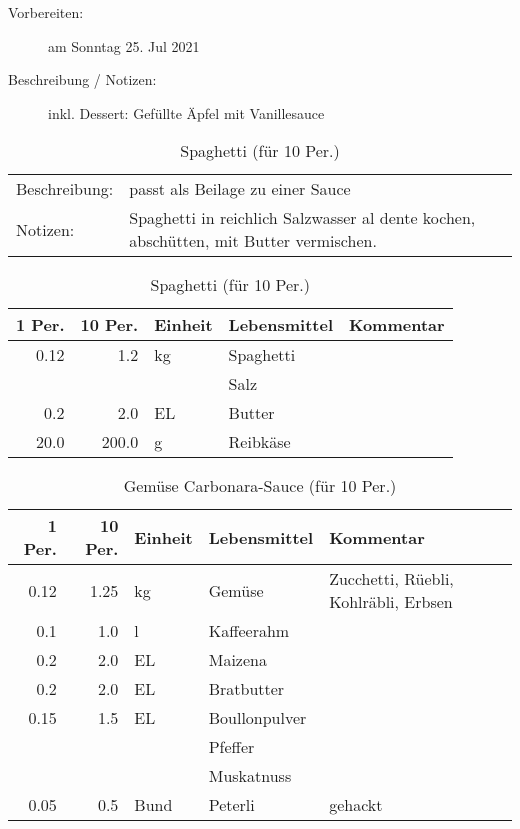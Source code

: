 \documentclass[11pt,a4paper]{article}%
\begin{document}
%
\begin{description}%
\item[Vorbereiten:]%
am Sonntag 25. Jul 2021%
\item[Beschreibung / Notizen:]%
inkl. Dessert: Gefüllte Äpfel mit Vanillesauce%
\end{description}%
\vspace{0.75cm}%
\renewcommand{\arraystretch}{1.25}%


\begin{table}[h]%
\caption{Spaghetti (für 10 Per.)}%
\begin{tabularx}{\textwidth}{l X}%
Beschreibung: &passt als Beilage zu einer Sauce\\%
Notizen:&Spaghetti in reichlich Salzwasser al dente kochen, abschütten, mit Butter vermischen.\newline%
\\%
\end{tabularx}%
\par%
\begin{tabularx}{\textwidth}{| r | r | l | l | X |}%
\hline%
\tiny{1 Per.}&\tiny{10 Per.}&\tiny{Einheit}&\tiny{Lebensmittel}&\tiny{Kommentar}\\%
\hline%
0.12&1.2&kg&Spaghetti&\\%
\hline%
&&&Salz&\\%
\hline%
0.2&2.0&EL&Butter&\\%
\hline%
20.0&200.0&g&Reibkäse&\\%
\hline%
\end{tabularx}%
\end{table}

%
\vspace{0.75cm}%
\renewcommand{\arraystretch}{1.25}%


\begin{table}[h]%
\caption{Gemüse Carbonara{-}Sauce (für 10 Per.)}%
\par%
\begin{tabularx}{\textwidth}{| r | r | l | l | X |}%
\hline%
\tiny{1 Per.}&\tiny{10 Per.}&\tiny{Einheit}&\tiny{Lebensmittel}&\tiny{Kommentar}\\%
\hline%
0.12&1.25&kg&Gemüse&Zucchetti, Rüebli, Kohlräbli, Erbsen\\%
\hline%
0.1&1.0&l&Kaffeerahm&\\%
\hline%
0.2&2.0&EL&Maizena&\\%
\hline%
0.2&2.0&EL&Bratbutter&\\%
\hline%
0.15&1.5&EL&Boullonpulver&\\%
\hline%
&&&Pfeffer&\\%
\hline%
&&&Muskatnuss&\\%
\hline%
0.05&0.5&Bund&Peterli&gehackt\\%
\hline%
\end{tabularx}%
\end{table}
\end{document}
